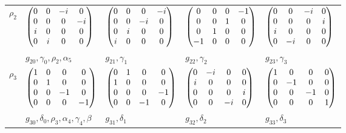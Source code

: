 \documentclass[handout,10pt]{beamer}
\begin{document}
\begin{frame}[shrink=20]{}
\begin{table}[]
\begin{tabular}{l l  l  l  l }
\hline
$\rho_2$ &$\begin{pmatrix}0 & 0 & -i & 0\cr 0 & 0 & 0 & -i\cr i & 0 & 0 & 0\cr 0 & i & 0 & 0\end{pmatrix}$  
& $\begin{pmatrix}0 & 0 & 0 & -i\cr 0 & 0 & -i & 0\cr 0 & i & 0 & 0\cr i & 0 & 0 & 0\end{pmatrix}$ 
& $\begin{pmatrix}0 & 0 & 0 & -1\cr 0 & 0 & 1 & 0\cr 0 & 1 & 0 & 0\cr -1 & 0 & 0 & 0\end{pmatrix}$ 
& $\begin{pmatrix}0 & 0 & -i & 0\cr 0 & 0 & 0 & i\cr i & 0 & 0 & 0\cr 0 & -i & 0 & 0\end{pmatrix}$ \\
&  $g_{20}, \gamma_0, \rho_2, \alpha_5$ & $g_{21}, \gamma_1$  & $g_{22}, \gamma_2$ & $g_{23}, \gamma_3$ \\
\hline
$\rho_3$ &$\begin{pmatrix}1 & 0 & 0 & 0\cr 0 & 1 & 0 & 0\cr 0 & 0 & -1 & 0\cr 0 & 0 & 0 & -1\end{pmatrix}$  
& $\begin{pmatrix}0 & 1 & 0 & 0\cr 1 & 0 & 0 & 0\cr 0 & 0 & 0 & -1\cr 0 & 0 & -1 & 0\end{pmatrix}$ 
& $\begin{pmatrix}0 & -i & 0 & 0\cr i & 0 & 0 & 0\cr 0 & 0 & 0 & i\cr 0 & 0 & -i & 0\end{pmatrix}$ 
& $\begin{pmatrix}1 & 0 & 0 & 0\cr 0 & -1 & 0 & 0\cr 0 & 0 & -1 & 0\cr 0 & 0 & 0 & 1\end{pmatrix}$ \\
 & $g_{30}, \delta_0, \rho_3, \alpha_4, \gamma_4 , \beta$ & $g_{31}, \delta_1$  & $g_{32}, \delta_2$ & $g_{33}, \delta_3$ \\
\hline
\end{tabular}
\end{table}

\end{frame}
\end{document}
